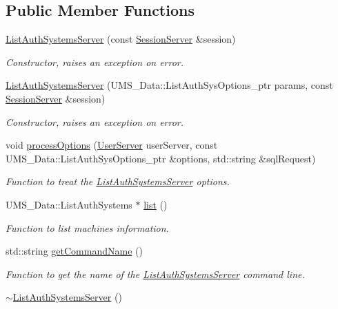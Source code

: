 \subsection*{Public Member Functions}
\begin{DoxyCompactItemize}
\item 
\hyperlink{classListAuthSystemsServer_a42cd15e8738c8102f6e41944c7f5b349}{ListAuthSystemsServer} (const \hyperlink{classSessionServer}{SessionServer} \&session)
\begin{DoxyCompactList}\small\item\em Constructor, raises an exception on error. \item\end{DoxyCompactList}\item 
\hyperlink{classListAuthSystemsServer_a02dff58c3556673b35b65a9af1384d2e}{ListAuthSystemsServer} (UMS\_\-Data::ListAuthSysOptions\_\-ptr params, const \hyperlink{classSessionServer}{SessionServer} \&session)
\begin{DoxyCompactList}\small\item\em Constructor, raises an exception on error. \item\end{DoxyCompactList}\item 
void \hyperlink{classListAuthSystemsServer_a6badd263bad4dd1b11fe6c1d87e74bd9}{processOptions} (\hyperlink{classUserServer}{UserServer} userServer, const UMS\_\-Data::ListAuthSysOptions\_\-ptr \&options, std::string \&sqlRequest)
\begin{DoxyCompactList}\small\item\em Function to treat the \hyperlink{classListAuthSystemsServer}{ListAuthSystemsServer} options. \item\end{DoxyCompactList}\item 
UMS\_\-Data::ListAuthSystems $\ast$ \hyperlink{classListAuthSystemsServer_a4cfd9ed49c97646f1f29889e26246443}{list} ()
\begin{DoxyCompactList}\small\item\em Function to list machines information. \item\end{DoxyCompactList}\item 
std::string \hyperlink{classListAuthSystemsServer_a798c4bacc3937d081cf39e599cbd8c37}{getCommandName} ()
\begin{DoxyCompactList}\small\item\em Function to get the name of the \hyperlink{classListAuthSystemsServer}{ListAuthSystemsServer} command line. \item\end{DoxyCompactList}\item 
\hypertarget{classListAuthSystemsServer_ac6761472369e84d903062c45de72f402}{
\hyperlink{classListAuthSystemsServer_ac6761472369e84d903062c45de72f402}{$\sim$ListAuthSystemsServer} ()}
\label{classListAuthSystemsServer_ac6761472369e84d903062c45de72f402}


\end{DoxyCompactItemize}
